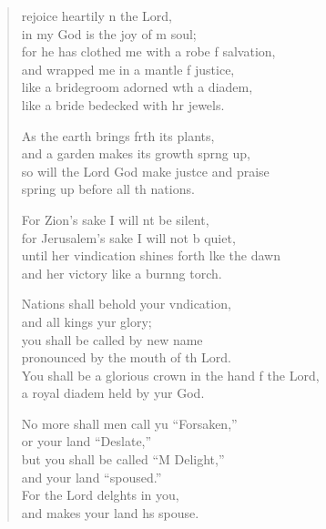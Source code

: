 \settowidth{\versewidth}{You shall be a glorious crown in the hand of the Lord, *}
\begin{verse}%
  \begin{patverse}
 rejoice heartily \pointup{\i}n the Lord,\Med\\
in my God is the joy of m soul;\\
for he has clothed me with a robe f salvation,\Med\\
and wrapped me in a mantle f justice,\\
like a bridegroom adorned w\pointup{\i}th a diadem,\Med\\
like a bride bedecked with hr jewels.

As the earth brings frth its plants,\Med\\
and a garden makes its growth spr\pointup{\i}ng up,\\
so will the Lord God make just\pointup{\i}ce and praise\Med\\
spring up before all th nations.

For Zion’s sake I will nt be silent,\Med\\
for Jerusalem’s sake I will not b quiet,\\
until her vindication shines forth l\pointup{\i}ke the dawn\Med\\
and her victory like a burn\pointup{\i}ng torch.

Nations shall behold your v\pointup{\i}ndication,\Med\\
and all kings yur glory;\\
you shall be called by  new name\Med\\
pronounced by the mouth of th Lord.\\
You shall be a glorious crown in the hand f the Lord,\Med\\
a royal diadem held by yur God.

No more shall men call yu “Forsaken,”\Med\\
or your land “Deslate,”\\
but you shall be called “M Delight,”\Med\\
and your land “spoused.”\\
For the Lord del\pointup{\i}ghts in you,\Med\\
and makes your land h\pointup{\i}s spouse.


\end{patverse}
\end{verse}
